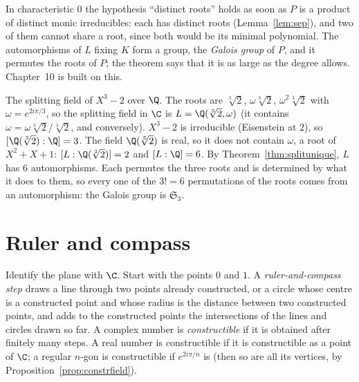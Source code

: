 In characteristic $0$ the hypothesis ``distinct roots'' holds as soon as $P$ is a product of distinct monic irreducibles: each has distinct roots (Lemma~\ref{lem:sep}), and two of them cannot share a root, since both would be its minimal polynomial. The automorphisms of $L$ fixing $K$ form a group, the \emph{Galois group} of $P$, and it permutes the roots of $P$; the theorem says that it is as large as the degree allows. Chapter~10 is built on this.

\begin{example}\label{ex:cuberoot}
The splitting field of $X^3-2$ over $\Q$. The roots are $\sqrt[3]2$, $\omega\sqrt[3]2$, $\omega^2\sqrt[3]2$ with $\omega=e^{2i\pi/3}$, so the splitting field in $\C$ is $L=\Q(\sqrt[3]2,\omega)$ (it contains $\omega=\omega\sqrt[3]2/\sqrt[3]2$, and conversely). $X^3-2$ is irreducible (Eisenstein at $2$), so $[\Q(\sqrt[3]2):\Q]=3$. The field $\Q(\sqrt[3]2)$ is real, so it does not contain $\omega$, a root of $X^2+X+1$: $[L:\Q(\sqrt[3]2)]=2$ and $[L:\Q]=6$. By Theorem~\ref{thm:splitunique}, $L$ has $6$ automorphisms. Each permutes the three roots and is determined by what it does to them, so every one of the $3!=6$ permutations of the roots comes from an automorphism: the Galois group is $\mathfrak S_3$.
\end{example}

\section{Ruler and compass}

Identify the plane with $\C$. Start with the points $0$ and $1$. A \emph{ruler-and-compass step} draws a line through two points already constructed, or a circle whose centre is a constructed point and whose radius is the distance between two constructed points, and adds to the constructed points the intersections of the lines and circles drawn so far. A complex number is \emph{constructible} if it is obtained after finitely many steps. A real number is constructible if it is constructible as a point of $\C$; a regular $n$-gon is constructible if $e^{2i\pi/n}$ is (then so are all its vertices, by Proposition~\ref{prop:constrfield}).

